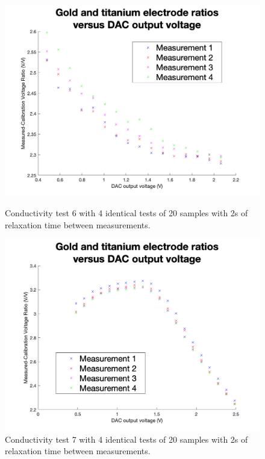 \begin{figure}[ht]
    \begin{minipage}{0.5\textwidth}
        \centering
        \includegraphics[width=\textwidth]{Figures/Testing/Aus16}
        \caption{Conductivity test 6 with 4 identical tests of 20 samples with 2s of relaxation time between measurements.}
        \label{fig:test9} %
    \end{minipage}
    \begin{minipage}{0.5\textwidth}
        \centering
        \includegraphics[width=\textwidth]{Figures/Testing/Ti16}
        \caption{Conductivity test 7 with 4 identical tests of 20 samples with 2s of relaxation time between measurements.}
        \label{fig:test10} %
    \end{minipage}
\end{figure}

